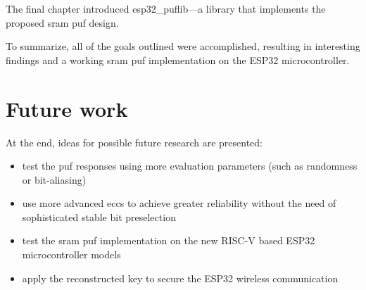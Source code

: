 The final chapter introduced esp32\_puflib---a library that implements the proposed \gls{sram} \gls{puf} design.

To summarize, all of the goals outlined were accomplished, resulting in interesting findings and a working \gls{sram} \gls{puf} implementation on the ESP32 microcontroller.

\newpage

\section*{Future work}
{}

At the end, ideas for possible future research are presented:
\begin{itemize}
    \item test the \gls{puf} responses using more evaluation parameters (such as randomness or bit-aliasing)
    \item use more advanced \glspl{ecc} to achieve greater reliability without the need of sophisticated stable bit preselection
    \item test the \gls{sram} \gls{puf} implementation on the new RISC-V based ESP32 microcontroller models
    \item apply the reconstructed key to secure the ESP32 wireless communication
\end{itemize}

